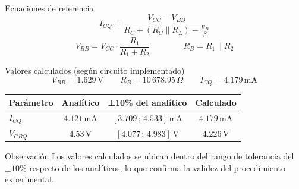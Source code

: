 \begin{frame}{}

  \begin{block}{Ecuaciones de referencia}
    \[
      I_{CQ} = \frac{V_{CC} - V_{BB}}{R_C + (R_C \parallel R_L) - \tfrac{R_B}{\beta}}
    \]
    \[
      V_{BB} = V_{CC}\cdot \frac{R_1}{R_1 + R_2}
      \qquad\qquad
      R_B = R_1 \parallel R_2
    \]
  \end{block}

  \begin{block}{Valores calculados (según circuito implementado)}
    \[
      V_{BB} = 1.629 \,\text{V}
      \qquad
      R_B = 10\,678.95 \,\Omega
      \qquad
      I_{CQ} = 4.179 \,\text{mA}
    \]
  \end{block}

\end{frame}


\begin{frame}{}

  \begin{table}[H]
  \centering
  \begin{tabular}{lccc}
    \toprule
    \textbf{Parámetro} & \textbf{Analítico} & \textbf{±10\% del analítico} & \textbf{Calculado} \\
    \midrule
    $I_{CQ}$  & $4.121\,\text{mA}$ & $[3.709\,;\,4.533]\,\text{mA}$ & $4.179\,\text{mA}$ \\
    $V_{CBQ}$ & $4.53\,\text{V}$   & $[4.077\,;\,4.983]\,\text{V}$  & $4.226\,\text{V}$ \\
    \bottomrule
  \end{tabular}
  \end{table}

  \vspace{1em}

  \begin{block}{Observación}
    Los valores calculados se ubican dentro del rango de tolerancia del
    $\pm 10\%$ respecto de los analíticos, lo que confirma la validez del
    procedimiento experimental.
  \end{block}

\end{frame}




